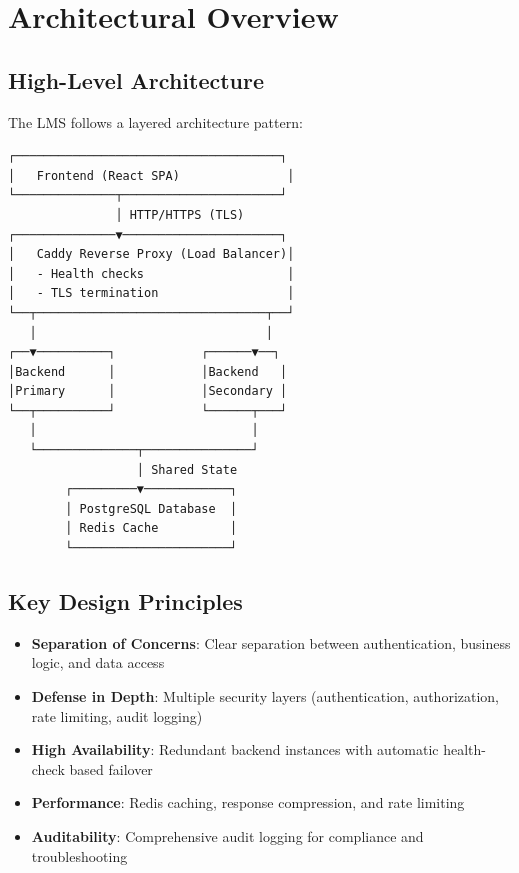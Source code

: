 \documentclass[12pt,oneside,a4paper]{article}
\begin{document}
\newpage

\section{Architectural Overview}

\subsection{High-Level Architecture}
The LMS follows a layered architecture pattern:

\begin{lstlisting}
┌─────────────────────────────────────┐
│   Frontend (React SPA)               │
└──────────────┬──────────────────────┘
               │ HTTP/HTTPS (TLS)
┌──────────────▼──────────────────────┐
│   Caddy Reverse Proxy (Load Balancer)│
│   - Health checks                    │
│   - TLS termination                  │
└──┬────────────────────────────────┬──┘
   │                                │
┌──▼──────────┐            ┌──────▼──┐
│Backend      │            │Backend   │
│Primary      │            │Secondary │
└──┬──────────┘            └──────┬───┘
   │                              │
   └──────────────┬───────────────┘
                  │ Shared State
        ┌─────────▼────────────┐
        │ PostgreSQL Database  │
        │ Redis Cache          │
        └──────────────────────┘
\end{lstlisting}

\subsection{Key Design Principles}
\begin{itemize}
    \item \textbf{Separation of Concerns}: Clear separation between authentication, business logic, and data access
    \item \textbf{Defense in Depth}: Multiple security layers (authentication, authorization, rate limiting, audit logging)
    \item \textbf{High Availability}: Redundant backend instances with automatic health-check based failover
    \item \textbf{Performance}: Redis caching, response compression, and rate limiting
    \item \textbf{Auditability}: Comprehensive audit logging for compliance and troubleshooting
\end{itemize}
\end{document}
